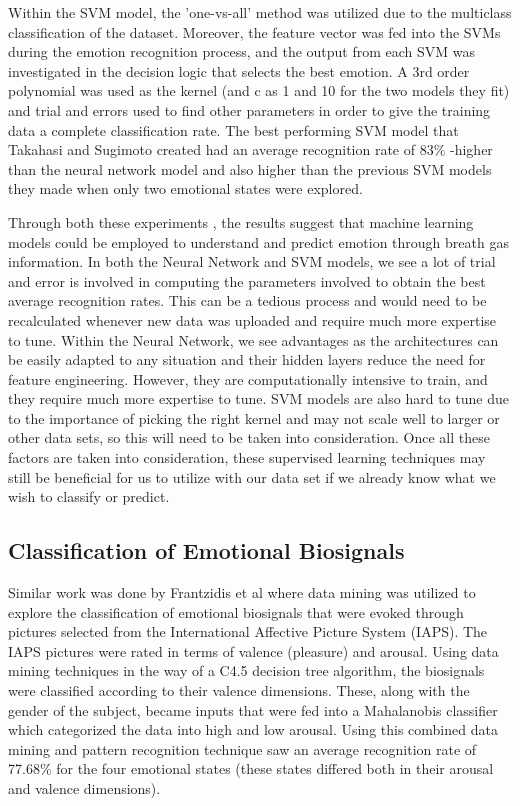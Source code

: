 \documentclass[letterpaper, 10 pt, conference]{ieeeconf}  %
\begin{document}
Within the SVM model, the 'one-vs-all' method was utilized due to the multiclass classification of the dataset. Moreover, the feature vector was fed into the SVMs during the emotion recognition process, and the output from each SVM was investigated in the decision logic that selects the best emotion.  A 3rd order polynomial was used as the kernel (and c as 1 and 10 for the two models they fit) and trial and errors used to find other parameters in order to give the training data a complete classification rate. The best performing SVM model that Takahasi and Sugimoto created had an average recognition rate of 83\% -higher than the neural network model and also higher than the previous SVM models they made when only two emotional states were explored. 

Through both these experiments \cite{4601732} \cite{Takahashi2008}, the results suggest that machine learning models could be employed to understand and predict emotion through breath gas information. In both the Neural Network and SVM models, we see a lot of trial and error is involved in computing the parameters involved to obtain the best average recognition rates. This can be a tedious process and would need to be recalculated whenever new data was uploaded and require much more expertise to tune. Within the Neural Network, we see advantages as the architectures can be easily adapted to any situation and their hidden layers reduce the need for feature engineering. However, they are computationally intensive to train, and they require much more expertise to tune. SVM models are also hard to tune due to the importance of picking the right kernel and may not scale well to larger or other data sets, so this will need to be taken into consideration. Once all these factors are taken into consideration, these supervised learning techniques may still be beneficial for us to utilize with our data set if we already know what we wish to classify or predict.

\subsection{Classification of Emotional Biosignals}
Similar work was done by Frantzidis et al \cite{5373931} where data mining was utilized to explore the classification of emotional biosignals that were evoked through pictures selected from the International Affective Picture System (IAPS).  The IAPS pictures were rated in terms of valence (pleasure) and arousal. Using data mining techniques in the way of a C4.5 decision tree algorithm, the biosignals were classified according to their valence dimensions.  These, along with the gender of the subject, became inputs that were fed into a Mahalanobis classifier which categorized the data into high and low arousal. Using this combined data mining and pattern recognition technique saw an average recognition rate of 77.68\% for the four emotional states (these states differed both in their arousal and valence dimensions). 
\end{document}

